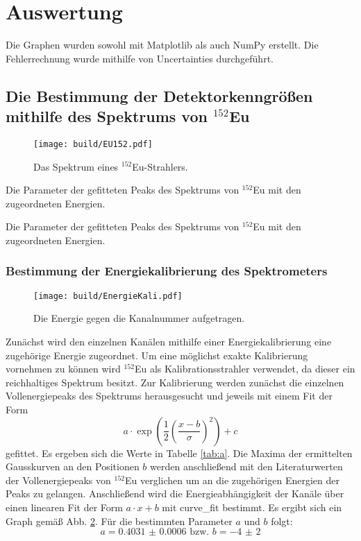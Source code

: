 \section{Auswertung}
\label{sec:Auswertung}
Die Graphen wurden sowohl mit Matplotlib \cite{matplotlib} als auch NumPy \cite{numpy} erstellt. Die
Fehlerrechnung wurde mithilfe von Uncertainties \cite{uncertainties} durchgeführt.
\subsection{Die Bestimmung der Detektorkenngrößen mithilfe des Spektrums von $^{152}$Eu} 
\begin{figure}
	\centering
	\texttt{[image: build/EU152.pdf]}
	\caption{Das Spektrum eines $^{152}$Eu-Strahlers.}
	\label{fig:1}
\end{figure}
\begin{table}
	\centering
	\caption{Die Parameter der gefitteten Peaks des Spektrums von $^{152}$Eu mit den zugeordneten Energien.}
	
\end{table}
\begin{table}
	\centering
	\caption{Die Parameter der gefitteten Peaks des Spektrums von $^{152}$Eu mit den zugeordneten Energien.}
	
\end{table}
\subsubsection{Bestimmung der Energiekalibrierung des Spektrometers}
\begin{figure}
	\centering
	\texttt{[image: build/EnergieKali.pdf]}
	\caption{Die Energie gegen die Kanalnummer aufgetragen.}
	\label{fig:E}
\end{figure}
Zunächst wird den einzelnen Kanälen mithilfe einer Energiekalibrierung eine zugehörige Energie zugeordnet. Um eine möglichst exakte Kalibrierung vornehmen zu können wird $^{152}$Eu als Kalibrationsstrahler verwendet, da dieser ein reichhaltiges Spektrum besitzt. Zur Kalibrierung werden zunächst die einzelnen Vollenergiepeaks des Spektrums herausgesucht und jeweils mit einem Fit der Form
\begin{equation}
    a \cdot \exp\left(\frac{1}{2}\left( \frac{x-b}{\sigma}\right)^2\right) +c
\end{equation}
gefittet. Es ergeben sich die Werte in Tabelle \ref{tab:a}. Die Maxima der ermittelten Gausskurven an den Positionen $b$ werden anschließend mit den Literaturwerten der Vollenergiepeaks von $^{152}$Eu \cite{Eu152} verglichen um an die zugehörigen Energien der Peaks zu gelangen. Anschließend wird die Energieabhängigkeit der Kanäle über einen linearen Fit der Form $a \cdot x+b $ mit curve\_fit \cite{scipy} bestimmt. Es ergibt sich ein Graph gemäß Abb. \ref{fig:E}. Für die bestimmten Parameter $a$ und $b$ folgt:
\begin{equation}
a = \num{0.4031(6)} \text{ bzw. } b = \num{-4(2)}
\end{equation}

